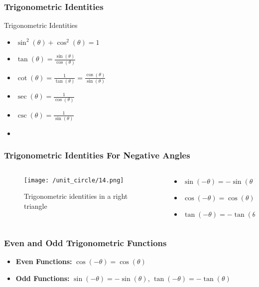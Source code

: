 \begin{frame}
    \frametitle{Trigonometric Identities}
   
    \begin{block}{Trigonometric Identities}
        \begin{itemize}
            \item \(\sin^2(\theta) + \cos^2(\theta) = 1\)
            \item \(\tan(\theta) = \frac{\sin(\theta)}{\cos(\theta)}\)
            \item \(\cot(\theta) = \frac{1}{\tan(\theta)} = \frac{\cos(\theta)}{\sin(\theta)}\)
            \item \(\sec(\theta) = \frac{1}{\cos(\theta)}\)
            \item \(\csc(\theta) = \frac{1}{\sin(\theta)}\)
            \item 
        \end{itemize}
    \end{block}
\end{frame}

\begin{frame}
\frametitle{Trigonometric Identities For Negative Angles}
\begin{columns}
    \begin{column}{0.5\textwidth}
        \begin{figure}
            \centering
            \texttt{[image: /unit\_circle/14.png]}
            \caption{Trigonometric identities in a right triangle}
        \end{figure}
    \end{column}
    \begin{column}{0.5\textwidth}
        \begin{block}{}
            \begin{itemize}
                \item \(\sin(-\theta) = -\sin(\theta)\)
                \item \(\cos(-\theta) = \cos(\theta)\)
                \item \(\tan(-\theta) = -\tan(\theta)\)
            \end{itemize}
        \end{block}
    \end{column}
\end{columns}
\end{frame} 

\begin{frame}
    \frametitle{Even and Odd Trigonometric Functions}
    \begin{itemize}
        \item \textbf{Even Functions:} \(\cos(-\theta) = \cos(\theta)\) 
        \item \textbf{Odd Functions:} \(\sin(-\theta) = -\sin(\theta)\), \(\tan(-\theta) = -\tan(\theta) \)
    \end{itemize}   
\end{frame}

